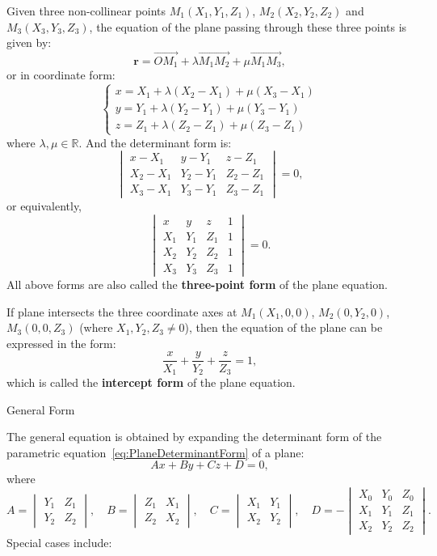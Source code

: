 \documentclass[11pt]{../../TexTemplate/elegantbook} %
\begin{document}
Given three non-collinear points \(M_{1}(X_{1}, Y_{1}, Z_{1})\), \(M_{2}(X_{2}, Y_{2}, Z_{2})\) and \(M_{3}(X_{3}, Y_{3}, Z_{3})\),
the equation of the plane passing through these three points is given by:
\[
\mathbf{r} = \vec{OM_{1}} + \lambda \vec{M_{1}M_{2}} + \mu \vec{M_{1}M_{3}},
\]
or in coordinate form:
\[
\begin{cases}
x = X_{1} + \lambda (X_{2} - X_{1}) + \mu (X_{3} - X_{1}) \\
y = Y_{1} + \lambda (Y_{2} - Y_{1}) + \mu (Y_{3} - Y_{1}) \\
z = Z_{1} + \lambda (Z_{2} - Z_{1}) + \mu (Z_{3} - Z_{1})
\end{cases}
\]
where \(\lambda, \mu \in \mathbb{R}\).
And the determinant form is:
\[
\begin{vmatrix}
x - X_{1} & y - Y_{1} & z - Z_{1} \\
X_{2} - X_{1} & Y_{2} - Y_{1} & Z_{2} - Z_{1} \\
X_{3} - X_{1} & Y_{3} - Y_{1} & Z_{3} - Z_{1}
\end{vmatrix} = 0,
\]
or equivalently,
\[
\begin{vmatrix}
x & y & z & 1 \\
X_{1} & Y_{1} & Z_{1} & 1 \\
X_{2} & Y_{2} & Z_{2} & 1 \\
X_{3} & Y_{3} & Z_{3} & 1
\end{vmatrix} = 0.
\]
All above forms are also called the \textbf{three-point form} of the plane equation.

If plane intersects the three coordinate axes at 
\(M_{1}(X_{1}, 0, 0)\), \(M_{2}(0, Y_{2}, 0)\), \(M_{3}(0, 0, Z_{3})\) (where \(X_{1}, Y_{2}, Z_{3} \neq 0\)), 
then the equation of the plane can be expressed in the form:
\[
\frac{x}{X_{1}} + \frac{y}{Y_{2}} + \frac{z}{Z_{3}} = 1,
\]
which is called the \textbf{intercept form} of the plane equation.

\begin{leftbarTitle}{General Form}\end{leftbarTitle}
The general equation is obtained by expanding the determinant form of 
the parametric equation~\ref{eq:PlaneDeterminantForm} of a plane:
\[
Ax + By + Cz + D = 0,
\]
where
\[
A = \begin{vmatrix} Y_{1} & Z_{1} \\ Y_{2} & Z_{2} \end{vmatrix}, \quad
B = \begin{vmatrix} Z_{1} & X_{1} \\ Z_{2} & X_{2} \end{vmatrix}, \quad
C = \begin{vmatrix} X_{1} & Y_{1} \\ X_{2} & Y_{2} \end{vmatrix}, \quad
D = -\begin{vmatrix} X_{0} & Y_{0} & Z_{0} \\ X_{1} & Y_{1} & Z_{1} \\ X_{2} & Y_{2} & Z_{2} \end{vmatrix}.
\]
Special cases include:
\end{document}
